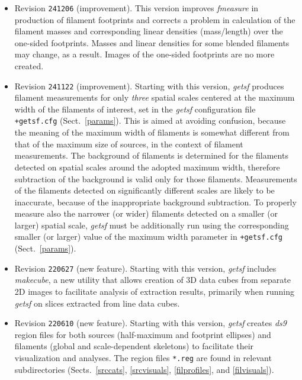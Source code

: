 \documentclass[a4paper,10pt]{article}
\begin{document}
\begin{itemize}
\item Revision \verb!241206! (improvement). This version improves \textsl{fmeasure} in production of filament footprints and
corrects a problem in calculation of the filament masses and corresponding linear densities (mass/length) over the one-sided 
footprints. Masses and linear densities for some blended filaments may change, as a result. Images of the one-sided footprints are 
no more created.

\item Revision \verb!241122! (improvement). Starting with this version, \textsl{getsf} produces filament measurements for only
\emph{three} spatial scales centered at the maximum width of the filaments of interest, set in the \textsl{getsf} configuration
file \verb!+getsf.cfg! (Sect.~\ref{params}). This is aimed at avoiding confusion, because the meaning of the maximum width of
filaments is somewhat different from that of the maximum size of sources, in the context of filament measurements. The background
of filaments is determined for the filaments detected on spatial scales around the adopted maximum width, therefore subtraction of
the background is valid only for those filaments. Measurements of the filaments detected on significantly different scales are
likely to be inaccurate, because of the inappropriate background subtraction. To properly measure also the narrower (or wider)
filaments detected on a smaller (or larger) spatial scale, \textsl{getsf} must be additionally run using the corresponding smaller
(or larger) value of the maximum width parameter in \verb!+getsf.cfg! (Sect.~\ref{params}).

\item Revision \verb!220627! (new feature). Starting with this version, \textsl{getsf} includes \textsl{makecube}, a new utility
that allows creation of 3D data cubes from separate 2D images to facilitate analysis of extraction results, primarily when running
\textsl{getsf} on slices extracted from line data cubes.

\item Revision \verb!220610! (new feature). Starting with this version, \textsl{getsf} creates \textsl{ds9} region files for both
sources (half-maximum and footprint ellipses) and filaments (global and scale-dependent skeletons) to facilitate their visualization
and analyses. The region files \verb!*.reg! are found in relevant subdirectories (Sects.~\ref{srccats}, \ref{srcvisuals}, 
\ref{filprofiles}, and \ref{filvisuals}).



\end{itemize}
\end{document}
